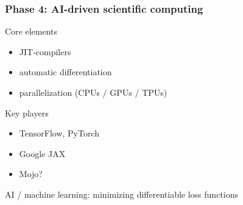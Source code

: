 \documentclass[
    xcolor={svgnames,dvipsnames},
    hyperref={colorlinks, citecolor=DeepPink4, linkcolor=DarkRed, urlcolor=DarkBlue}
    ]{beamer}  %
\newcommand{\1}{\mathbbm 1}
\begin{document}
\begin{frame}
    \frametitle{Phase 4: AI-driven scientific computing}

    Core elements
    \begin{itemize}
        \item JIT-compilers
        \vspace{0.5em}
        \item automatic differentiation
        \vspace{0.5em}
        \item parallelization (CPUs / GPUs / TPUs)
    \end{itemize}

    Key players
    \begin{itemize}
        \item TensorFlow, PyTorch 
        \vspace{0.5em}
        \item Google JAX
        \vspace{0.5em}
        \item Mojo?
    \end{itemize}
    
\end{frame}

\begin{frame}
    

    AI / machine learning: minimizing differentiable loss functions
    
    \begin{figure}
       \begin{center}
       \end{center}
    \end{figure}


\end{frame}
\end{document}
